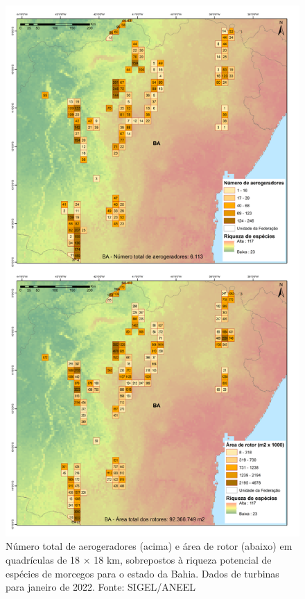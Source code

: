 \documentclass[
  oneside]{scrbook}
\begin{document}
\begin{figure}[H]

{\centering \includegraphics[width=0.7\linewidth]{imagens/cap09/Figura_9.12} 

}

\caption{Número total de aerogeradores (acima) e área de rotor (abaixo) em quadrículas de 18 × 18 km, sobrepostos à riqueza potencial de espécies de morcegos para o estado da Bahia. Dados de turbinas para janeiro de 2022. Fonte: SIGEL/ANEEL}\label{fig:77}
\end{figure}
\end{document}
